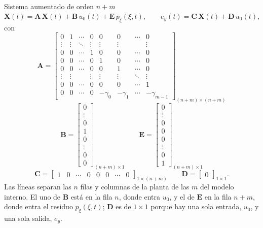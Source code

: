 \begin{recuadro}{Sistema aumentado de orden $n+m$}
\begin{equation}
\dot{\mathbf{X}}(t) = \mathbf{A}\,\mathbf{X}(t) + \mathbf{B}\,u_0(t)
+ \mathbf{E}\,p_{\xi}(\xi,t),
\qquad
e_y(t) = \mathbf{C}\,\mathbf{X}(t) + \mathbf{D}\,u_0(t),
\label{eq:aumentado}
\end{equation}
con
\begin{equation}
\mathbf{A} =
\left[\begin{array}{cccc|cccc}
0 & 1 & \cdots & 0 & 0 & 0 & \cdots & 0 \\
\vdots & \vdots & \ddots & \vdots & \vdots & \vdots & & \vdots \\
0 & 0 & \cdots & 1 & 0 & 0 & \cdots & 0 \\
0 & 0 & \cdots & 0 & 1 & 0 & \cdots & 0 \\ \hline
0 & 0 & \cdots & 0 & 0 & 1 & \cdots & 0 \\
\vdots & \vdots & & \vdots & \vdots & \vdots & \ddots & \vdots \\
0 & 0 & \cdots & 0 & 0 & 0 & \cdots & 1 \\
0 & 0 & \cdots & 0 & -\gamma_0 & -\gamma_1 & \cdots & -\gamma_{m-1}
\end{array}\right]_{(n+m) \times (n+m)}
\end{equation}
\begin{equation}
\mathbf{B} =
\left[\begin{array}{c}
0 \\ \vdots \\ 0 \\ 1 \\ \hline 0 \\ \vdots \\ 0 \\ 0
\end{array}\right]_{(n+m) \times 1}
\qquad
\mathbf{E} =
\left[\begin{array}{c}
0 \\ \vdots \\ 0 \\ 0 \\ \hline 0 \\ \vdots \\ 0 \\ 1
\end{array}\right]_{(n+m) \times 1}
\end{equation}
\begin{equation}
\mathbf{C} =
\left[\begin{array}{cccc|cccc}
1 & 0 & \cdots & 0 & 0 & 0 & \cdots & 0
\end{array}\right]_{1 \times (n+m)}
\qquad
\mathbf{D} = \begin{bmatrix} 0 \end{bmatrix}_{1 \times 1} .
\end{equation}
Las líneas separan las $n$ filas y columnas de la planta de las $m$ del modelo
interno. El uno de $\mathbf{B}$ está en la fila $n$, donde entra $u_0$, y el de
$\mathbf{E}$ en la fila $n+m$, donde entra el residuo $p_{\xi}(\xi,t)$;
$\mathbf{D}$ es de $1 \times 1$ porque hay una sola entrada, $u_0$, y una sola
salida, $e_y$.
\end{recuadro}

